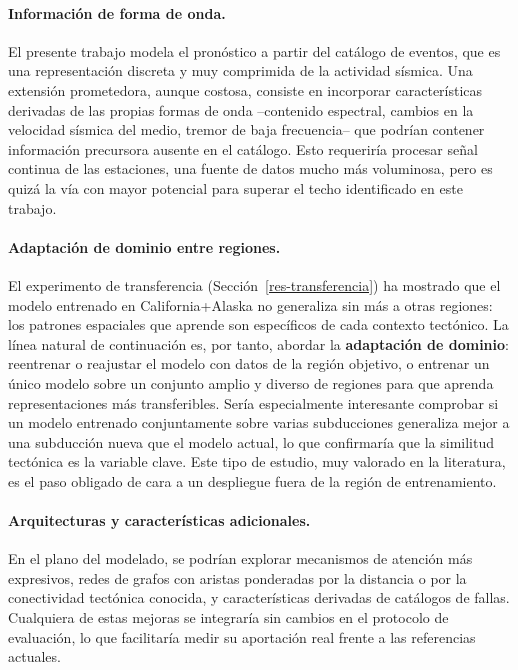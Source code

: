 \paragraph{Información de forma de onda.} El presente trabajo modela el pronóstico a partir del
catálogo de eventos, que es una representación discreta y muy comprimida de la actividad
sísmica. Una extensión prometedora, aunque costosa, consiste en incorporar características
derivadas de las propias formas de onda --contenido espectral, cambios en la velocidad sísmica
del medio, tremor de baja frecuencia-- que podrían contener información precursora ausente en el
catálogo. Esto requeriría procesar señal continua de las estaciones, una fuente de datos mucho
más voluminosa, pero es quizá la vía con mayor potencial para superar el techo identificado en
este trabajo.

\paragraph{Adaptación de dominio entre regiones.} El experimento de transferencia
(Sección~\ref{res-transferencia}) ha mostrado que el modelo entrenado en California+Alaska no
generaliza sin más a otras regiones: los patrones espaciales que aprende son específicos de cada
contexto tectónico. La línea natural de continuación es, por tanto, abordar la
\textbf{adaptación de dominio}: reentrenar o reajustar el modelo con datos de la región objetivo,
o entrenar un único modelo sobre un conjunto amplio y diverso de regiones para que aprenda
representaciones más transferibles. Sería especialmente interesante comprobar si un modelo
entrenado conjuntamente sobre varias subducciones generaliza mejor a una subducción nueva que el
modelo actual, lo que confirmaría que la similitud tectónica es la variable clave. Este tipo de
estudio, muy valorado en la literatura, es el paso obligado de cara a un despliegue fuera de la
región de entrenamiento.

\paragraph{Arquitecturas y características adicionales.} En el plano del modelado, se podrían
explorar mecanismos de atención más expresivos, redes de grafos con aristas ponderadas por la
distancia o por la conectividad tectónica conocida, y características derivadas de catálogos de
fallas. Cualquiera de estas mejoras se integraría sin cambios en el protocolo de evaluación, lo
que facilitaría medir su aportación real frente a las referencias actuales.

